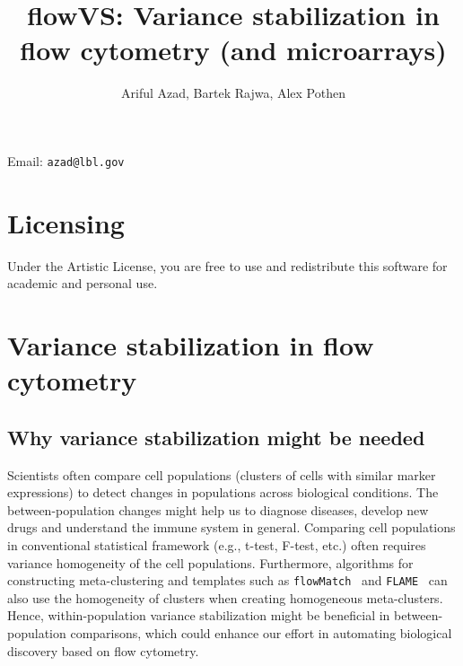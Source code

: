 \documentclass{article}\usepackage[]{graphicx}\usepackage[]{color}
\title{flowVS: Variance stabilization in flow cytometry (and microarrays)}
\author{Ariful Azad, Bartek Rajwa, Alex Pothen}
\newcommand{\Rpackage}[1]{{\texttt{#1}}}
\begin{document}





\maketitle
\begin{center}
{Email: \tt azad@lbl.gov}
\end{center}

\textnormal{\normalfont}

\tableofcontents
\newpage


\section{Licensing}

Under the Artistic License, you are free to use and redistribute this software for academic and personal use. 

\section{Variance stabilization in flow cytometry}
\subsection{Why variance stabilization might be needed}
Scientists often compare cell populations (clusters of cells with similar marker expressions) to detect changes in populations across biological conditions.
The between-population changes might help us to diagnose diseases, develop new drugs and understand the immune system in general.
Comparing cell populations in conventional statistical framework (e.g., t-test, F-test, etc.) often requires variance homogeneity of the cell populations. 
Furthermore, algorithms for constructing meta-clustering and templates such as \Rpackage{flowMatch}~\cite{azad2012matching, azad2013classifying} and \Rpackage{FLAME}~\cite{pyne2009automated} can also use the homogeneity of clusters when creating homogeneous meta-clusters.
Hence, within-population variance stabilization might be beneficial in between-population comparisons, which could enhance our effort in automating biological discovery based on flow cytometry.    
\end{document}
